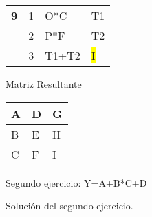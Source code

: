 {\begin{tabular}{|p{96pt}p{96pt}p{96pt}p{96pt}|}
{} \\
\hline
\parbox{96pt}{\raggedright 
\textbf{9}
} & \parbox{96pt}{\raggedright 
1
} & \parbox{96pt}{\raggedright 
O*C
} & \parbox{96pt}{\raggedright 
T1
} \\
\hline
\parbox{96pt}{\raggedright } & \parbox{96pt}{\raggedright 
2
} & \parbox{96pt}{\raggedright 
P*F
} & \parbox{96pt}{\raggedright 
T2
} \\
\hline
\parbox{96pt}{\raggedright } & \parbox{96pt}{\raggedright 
3
} & \parbox{96pt}{\raggedright 
T1+T2
} & \parbox{96pt}{\raggedright 
\colorbox[HTML]{FFFF00}{I}
} \\
\hline
\end{tabular}
\vspace{2pt}

}
\vspace{1cm}

\begin{center}
Matriz Resultante
\end{center}

\begin{center}

\vspace{3pt} \noindent
\begin{tabular}{|p{33pt}|p{33pt}|p{33pt}|}
\hline
\parbox{33pt}{\centering 
A
} & \parbox{33pt}{\centering 
D
} & \parbox{33pt}{\centering 
G
} \\
\hline
\parbox{33pt}{\centering 
B
} & \parbox{33pt}{\centering 
E
} & \parbox{33pt}{\centering 
H
} \\
\hline
\parbox{33pt}{\centering 
C
} & \parbox{33pt}{\centering 
F
} & \parbox{33pt}{\centering 
I
} \\
\hline
\end{tabular}
\vspace{2pt}

\end{center}

Segundo ejercicio: Y=A+B*C+D \hfill \break

Solución del segundo ejercicio.


